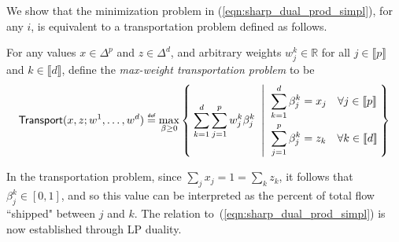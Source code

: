 \documentclass[smallextended]{svjour3}
\newcommand\defeq{\mathrel{\overset{\makebox[0pt]{\mbox{\normalfont\tiny\sffamily def}}}{=}}}
\newcommand{\trans}{\mathsf{Transport}}
\begin{document}
We show that the minimization problem in (\ref{eqn:sharp_dual_prod_simpl}), for any $i$, is equivalent to a transportation problem defined as follows.
\begin{definition} \label{def:trans}
For any values $x \in \Delta^p$ and $z \in \Delta^d$, and arbitrary weights $w^k_j\in\mathbb{R}$ for all $j\in\llbracket p\rrbracket$ and $k\in\llbracket d \rrbracket$, define the \textit{max-weight transportation problem} to be
\begin{alignat*}{2}
\trans(x,z;w^1,\ldots,w^d) \defeq \max_{\beta \geq 0}\Set{\sum_{k=1}^d\sum_{j=1}^pw^k_j\beta^k_j \;|\; \begin{alignedat}{3}\sum_{k=1}^d\beta^k_j &=x_j \quad\forall j\in\llbracket p\rrbracket \\
\sum_{j=1}^p\beta^k_j &=z_k \quad\forall k\in\llbracket d\rrbracket\end{alignedat}}
\end{alignat*}
\end{definition}
In the transportation problem, since $\sum_jx_j=1=\sum_kz_k$, it follows that $\beta^k_j \in [0,1]$, and so this value can be interpreted as the percent of total flow ``shipped" between $j$ and $k$.
The relation to~(\ref{eqn:sharp_dual_prod_simpl}) is now established through LP duality.
\end{document}
